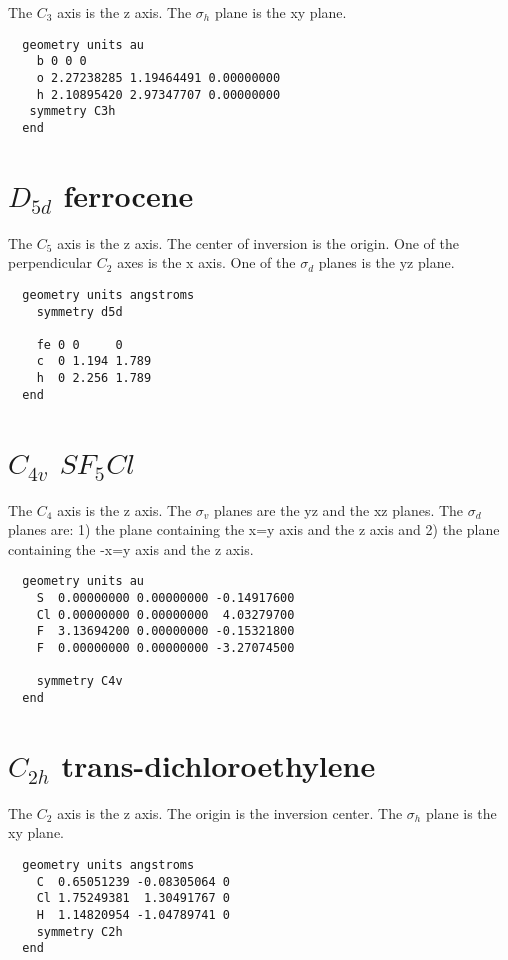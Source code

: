 The $C_3$ axis is the z axis.  The $\sigma_h$ plane is the xy plane.

\begin{verbatim}
  geometry units au
    b 0 0 0 
    o 2.27238285 1.19464491 0.00000000 
    h 2.10895420 2.97347707 0.00000000 
   symmetry C3h
  end
\end{verbatim}

  \section{\protect$D_{5d}$ ferrocene}

The $C_5$ axis is the z axis.  The center of inversion is the origin.
One of the perpendicular $C_2$ axes is the x axis.  One of the $\sigma_d$
planes is the yz plane.

\begin{verbatim}
  geometry units angstroms
    symmetry d5d

    fe 0 0     0 
    c  0 1.194 1.789 
    h  0 2.256 1.789 
  end
\end{verbatim}

  \section{\protect$C_{4v}$ \protect$SF_5Cl$}

The $C_4$ axis is the z axis.  The $\sigma_v$ planes are the yz and the xz
planes.  The $\sigma_d$ planes are: 1) the plane containing the x=y axis and
the z axis and 2) the plane containing the -x=y axis and the z axis.

\begin{verbatim}
  geometry units au
    S  0.00000000 0.00000000 -0.14917600 
    Cl 0.00000000 0.00000000  4.03279700 
    F  3.13694200 0.00000000 -0.15321800 
    F  0.00000000 0.00000000 -3.27074500 

    symmetry C4v
  end
\end{verbatim}

  \section{\protect$C_{2h}$ trans-dichloroethylene}

The $C_2$ axis is the z axis.  The origin is the inversion center.
The $\sigma_h$ plane is the xy plane.

\begin{verbatim}
  geometry units angstroms
    C  0.65051239 -0.08305064 0 
    Cl 1.75249381  1.30491767 0 
    H  1.14820954 -1.04789741 0 
    symmetry C2h
  end
\end{verbatim}

